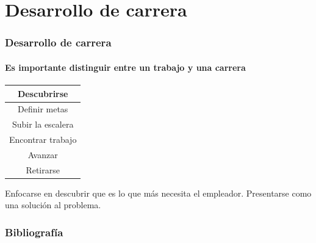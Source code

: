 \documentclass[xcolor=table]{beamer}
\begin{document}
	\section{Desarrollo de carrera}
	\begin{frame}
    		\frametitle{Desarrollo de carrera}
		\framesubtitle{Es importante distinguir entre un trabajo y una carrera}
		\begin{table}[]
			\begin{tabular}{|c|}
				\hline
				\rowcolor[HTML]{FD6864} 
				Descubrirse         \\ \hline
				\rowcolor[HTML]{FE996B} 
				Definir metas                      \\ \hline
				\rowcolor[HTML]{FFFE65} 
				{\color[HTML]{000000} Subir la escalera} \\ \hline
				\rowcolor[HTML]{67FD9A} 
				Encontrar trabajo                  \\ \hline
				\rowcolor[HTML]{38FFF8} 
				Avanzar                            \\ \hline
				\rowcolor[HTML]{DAE8FC} 
				Retirarse                          \\ \hline
			\end{tabular}
		\end{table}
		\begin{tcolorbox}[colback=white,colframe=udlacolour,title=El valor de la investigación]
    			Enfocarse en descubrir que es lo que más necesita el empleador. Presentarse como una solución al problema.
    		\end{tcolorbox}
		
	\end{frame}
    	\begin{frame}%
        	\frametitle{Bibliografía}
        	{\footnotesize
        		
        		
        	}
        \end{frame}
\end{document}
